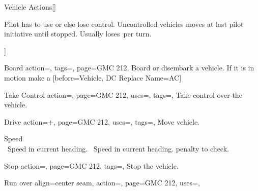 \begin{PageBackLandscape}
\begin{TablesHalf}{\backTableHeight}
\begin{Table}{Vehicle Actions}[]
\begin{minipage}[b]{0.755\linewidth}
                Pilot has to use  or  else lose control.\hfill
                Uncontrolled vehicles moves at last pilot initiative until stopped.
                Usually loses \,\Feet per turn.%
            \end{minipage}%
        ]
            \begin{entry}{Board}{%
                action=,
                tags=\Move,
                page=GMC 212,
            }
                Board or disembark a vehicle. \hfill
                If it is in motion make a
                [before=Vehicle, DC Replace Name=AC]
            \end{entry}
            \begin{entry}{Take Control}{%
                action=,
                page=GMC 212,
                uses=\Piloting,
                tags=\Manipulate,
            }
                Take control over the vehicle. \hfill{} \hfill
            \end{entry}
            \begin{entry}{Drive}{%
                action=+,
                page=GMC 212,
                uses=\Piloting,
                tags=\Move,
            }
                Move vehicle.\hfill
                \begin{minipage}[c]{0.78\linewidth}
                     Speed \quad{} \quad {}\quad {} \\
                    \Reck\, Speed in current heading.\hfill
                    \Reck\, Speed in current heading.  penalty to check.
                \end{minipage}
            \end{entry}
            \begin{entry}{Stop}{%
                action=,
                page=GMC 212,
                tags=\Manipulate,
            }
                Stop the vehicle.
            \end{entry}
            \begin{entry}{Run over}{%
                align=center seam,
                action=,
                page=GMC 212,
                uses={\Piloting[tags=R]},
            }

\end{entry}
\end{Table}
\end{TablesHalf}
\end{PageBackLandscape}
